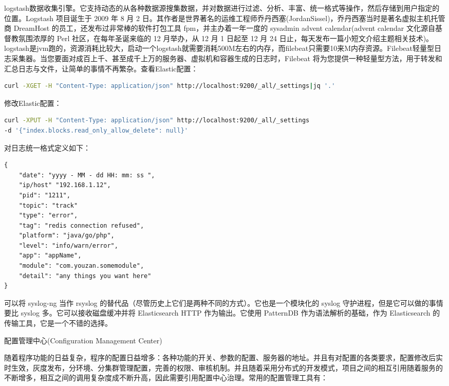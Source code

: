 \documentclass[8pt]{book}
\makeatletter
\numberwithin{dummy}{section}
\theoremstyle{ocrenumbox}
\theoremstyle{blacknumex}
\theoremstyle{blacknumbox}
\theoremstyle{ocrenum}
\renewcommand{\section}{\@startsection{section}{1}{\z@}
	{-4ex \@plus -1ex \@minus -.4ex}
	{1ex \@plus.2ex }
	{\normalfont\large\sffamily\bfseries}}
\makeatother
\begin{document}
logstash数据收集引擎。它支持动态的从各种数据源搜集数据，并对数据进行过滤、分析、丰富、统一格式等操作，然后存储到用户指定的位置。Logstash 项目诞生于 2009 年 8 月 2 日。其作者是世界著名的运维工程师乔丹西塞(JordanSissel)，乔丹西塞当时是著名虚拟主机托管商 DreamHost 的员工，还发布过非常棒的软件打包工具 fpm，并主办着一年一度的 sysadmin advent calendar(advent calendar 文化源自基督教氛围浓厚的 Perl 社区，在每年圣诞来临的 12 月举办，从 12 月 1 日起至 12 月 24 日止，每天发布一篇小短文介绍主题相关技术)。logstash是jvm跑的，资源消耗比较大，启动一个logstash就需要消耗500M左右的内存，而filebeat只需要10来M内存资源。Filebeat轻量型日志采集器。当您要面对成百上千、甚至成千上万的服务器、虚拟机和容器生成的日志时，Filebeat 将为您提供一种轻量型方法，用于转发和汇总日志与文件，让简单的事情不再繁杂。查看Elastic配置：

\begin{lstlisting}[language=Bash]
curl -XGET -H "Content-Type: application/json" http://localhost:9200/_all/_settings|jq '.'
\end{lstlisting}

修改Elastic配置：

\begin{lstlisting}[language=Bash]
curl -XPUT -H "Content-Type: application/json" http://localhost:9200/_all/_settings 
-d '{"index.blocks.read_only_allow_delete": null}'
\end{lstlisting}

对日志统一格式定义如下：


\begin{lstlisting}
{
	"date": "yyyy - MM - dd HH: mm: ss ",
	"ip/host" "192.168.1.12",
	"pid": "1211",
	"topic": "track"
	"type": "error",
	"tag": "redis connection refused",
	"platform": "java/go/php",
	"level": "info/warn/error",
	"app": "appName",
	"module": "com.youzan.somemodule",
	"detail": "any things you want here"
}
\end{lstlisting}


可以将 syslog-ng 当作 rsyslog 的替代品（尽管历史上它们是两种不同的方式）。它也是一个模块化的 syslog 守护进程，但是它可以做的事情要比 syslog 多。它可以接收磁盘缓冲并将 Elasticsearch HTTP 作为输出。它使用 PatternDB 作为语法解析的基础，作为 Elasticsearch 的传输工具，它是一个不错的选择。


\section{配置管理中心(Configuration Management Center)}

随着程序功能的日益复杂，程序的配置日益增多：各种功能的开关、参数的配置、服务器的地址。并且有对配置的各类要求，配置修改后实时生效，灰度发布，分环境、分集群管理配置，完善的权限、审核机制。并且随着采用分布式的开发模式，项目之间的相互引用随着服务的不断增多，相互之间的调用复杂度成不断升高，因此需要引用配置中心治理。常用的配置管理工具有：
\end{document}
